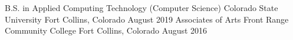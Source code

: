 
\begin{cventries}
\cventry
    {B.S. in Applied Computing Technology (Computer Science)}
    {Colorado State University}
    {Fort Collins, Colorado}
    {August 2019}
    {}
\cventry
	{Associates of Arts}
	{Front Range Community College}
	{Fort Collins, Colorado}
	{August 2016}
	{}
	\vspace{-.5\baselineskip}
\end{cventries}
\vspace{-1.2\baselineskip}
